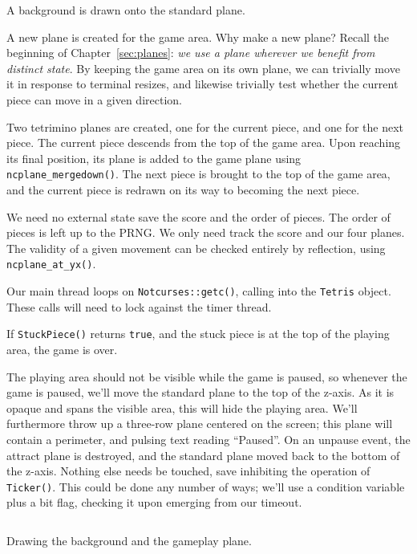 \begin{denseitemize}
\item{A background is drawn onto the standard plane.}
\item{A new plane is created for the game area. Why make a new plane? Recall
    the beginning of Chapter~\ref{sec:planes}: \textit{we use a plane wherever we
    benefit from distinct state}. By keeping the game area on its own plane,
    we can trivially move it in response to terminal resizes, and likewise
    trivially test whether the current piece can move in a given direction.}
\item{Two tetrimino planes are created, one for the current piece, and one for
    the next piece. The current piece descends from the top of the game area.
    Upon reaching its final position, its plane is added to the game plane
    using \texttt{ncplane\_mergedown()}. The next piece is brought to the top
    of the game area, and the current piece is redrawn on its way to becoming
    the next piece.}
\item{We need no external state save the score and the order of pieces. The order
    of pieces is left up to the PRNG. We only need track the score and
    our four planes. The validity of a given movement can be checked entirely
    by reflection, using \texttt{ncplane\_at\_yx()}.}
\item{Our main thread loops on \texttt{Notcurses::getc()}, calling into the
    \texttt{Tetris} object. These calls will need to lock against the timer thread.}
\item{If \texttt{StuckPiece()} returns \texttt{true}, and the stuck piece
    is at the top of the playing area, the game is over.}
\end{denseitemize}

The playing area should not be visible while the game is paused, so whenever
the game is paused, we'll move the standard plane to the top of the z-axis. As
it is opaque and spans the visible area, this will hide the playing area. We'll
furthermore throw up a three-row plane centered on the screen; this plane will
contain a perimeter, and pulsing text reading ``Paused''. On an unpause event,
the attract plane is destroyed, and the standard plane moved back to the bottom
of the z-axis. Nothing else needs be touched, save inhibiting the operation
of \texttt{Ticker()}. This could be done any number of ways; we'll use a
condition variable plus a bit flag, checking it upon emerging from our timeout.

\begin{listing}[!htb]
\inputminted[]{C}{code-tetris/background.h}
\caption{Drawing the background and the gameplay plane.}
\label{list:tetris-background}
\end{listing}

